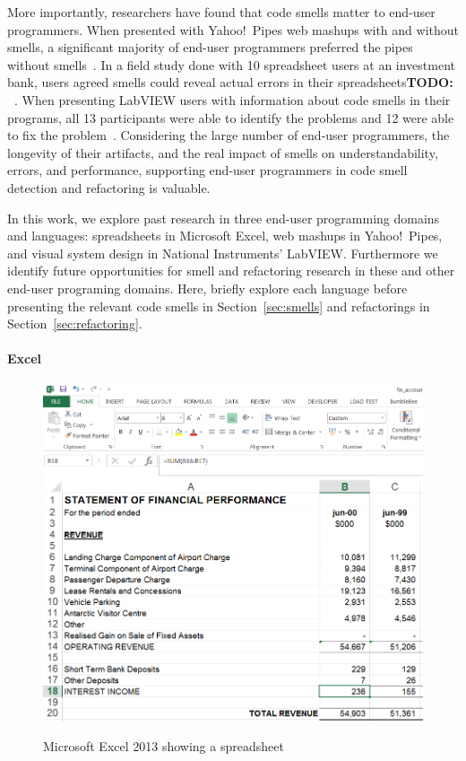 \documentclass[10pt,conference,compsocconf]{IEEEtran}
\newcommand{\todo}[1]{\textbf{TODO: #1}}
\begin{document}
More importantly, researchers have  found that code smells matter to end-user programmers.
When presented with Yahoo!\ Pipes web mashups with and without smells, a significant majority of end-user programmers preferred the pipes without smells~\cite{StoleeTSE2013}.
In a field study done with 10 spreadsheet users at an investment bank, users agreed smells could reveal actual errors in their spreadsheets\todo{~\cite{}}.
When presenting LabVIEW users with information about code smells in their programs, all 13 participants were able to identify the problems and 12 were able to fix the problem~\cite{chambers2013smell}.
Considering the large number of end-user programmers, the longevity of their artifacts, and the real impact of smells on understandability, errors, and performance, supporting end-user programmers in code smell detection and refactoring is valuable. 

In this work, we explore past research in three end-user programming domains and languages: spreadsheets in Microsoft Excel, web mashups in Yahoo!\ Pipes, and visual system design in National Instruments' LabVIEW. Furthermore we identify future opportunities for smell and refactoring research in these and other end-user programing domains. Here, briefly explore each language  before presenting the relevant code smells in  Section~\ref{sec:smells} and refactorings in Section~\ref{sec:refactoring}.

\paragraph{Excel}

\begin{figure}
\caption{Microsoft Excel 2013 showing a spreadsheet}
\centering
\includegraphics[width=\columnwidth]{excel-2}
\label{fig:spreadsheetexample}
\end{figure}
\end{document}
